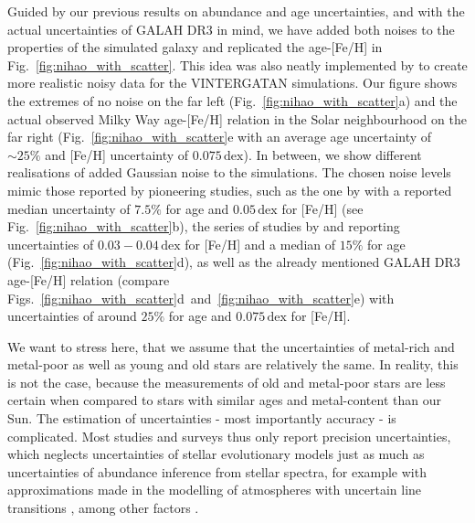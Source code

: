 \documentclass[fleqn,usenatbib]{mnras}
\begin{document}
Guided by our previous results on abundance and age uncertainties, and with the actual uncertainties of GALAH DR3 in mind, we have added both noises to the properties of the simulated galaxy and replicated the age-[Fe/H] in Fig.~\ref{fig:nihao_with_scatter}. This idea was also neatly implemented by \citet[][see their Fig.~12]{Renaud2021} to create more realistic noisy data for the \textsc{VINTERGATAN} simulations. Our figure shows the extremes of no noise on the far left (Fig.~\ref{fig:nihao_with_scatter}a) and the actual observed Milky Way age-[Fe/H] relation in the Solar neighbourhood on the far right (Fig.~\ref{fig:nihao_with_scatter}e with an average age uncertainty of $\sim 25\%$ and [Fe/H] uncertainty of $0.075\,\mathrm{dex}$). In between, we show different realisations of added Gaussian noise to the simulations. The chosen noise levels mimic those reported by pioneering studies, such as the one by \citet{Xiang2022} with a reported median uncertainty of $7.5\%$ for age and $0.05\,\mathrm{dex}$ for [Fe/H] (see Fig.~\ref{fig:nihao_with_scatter}b), the series of studies by \citet{Nissen2010} and \citet{Schuster2012} reporting uncertainties of $0.03-0.04\,\mathrm{dex}$ for [Fe/H] and a median of $15\%$ for age (Fig.~\ref{fig:nihao_with_scatter}d), as well as the already mentioned GALAH DR3 age-[Fe/H] relation (compare Figs.~\ref{fig:nihao_with_scatter}d~and~\ref{fig:nihao_with_scatter}e) with uncertainties of around $25\%$ for age and $0.075\,\mathrm{dex}$ for [Fe/H]. 

We want to stress here, that we assume that the uncertainties of metal-rich and metal-poor as well as young and old stars are relatively the same. In reality, this is not the case, because the measurements of old and metal-poor stars are less certain \citep{Frebel2015} when compared to stars with similar ages and metal-content than our Sun. The estimation of uncertainties - most importantly accuracy - is complicated. Most studies and surveys thus only report precision uncertainties, which neglects uncertainties of stellar evolutionary models \citep{Soderblom2010} just as much as uncertainties of abundance inference from stellar spectra, for example with approximations made in the modelling of atmospheres with uncertain line transitions \citep{Mihalas1973, Asplund2005}, among other factors \citep{Jofre2017, Jofre2018, Nissen2018}.
\end{document}
